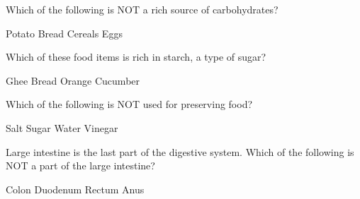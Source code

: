 \documentclass[a4paper]{exam}
\begin{document}
\begin{questions}
\question Which of the following is NOT a rich source of carbohydrates?

\begin{oneparchoices}
    \choice Potato
    \choice Bread
    \choice Cereals
    \choice Eggs
\end{oneparchoices}

\question Which of these food items is rich in starch, a type of sugar?

\begin{oneparchoices}
    \choice Ghee
    \choice Bread
    \choice Orange
    \choice Cucumber
\end{oneparchoices}

\question Which of the following is NOT used for preserving food?

\begin{oneparchoices}
    \choice Salt
    \choice Sugar
    \choice Water
    \choice Vinegar
\end{oneparchoices}

\question Large intestine is the last part of the digestive system. Which of the following is NOT a part of the large intestine?

\begin{oneparchoices}
    \choice Colon
    \choice Duodenum
    \choice Rectum
    \choice Anus
\end{oneparchoices}

\end{questions}
\end{document}
